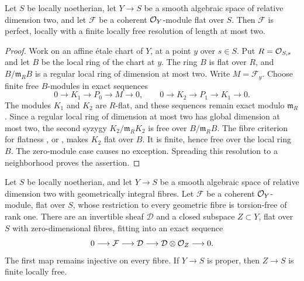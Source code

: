 \begin{lemma}\label{lem:smooth-surface-flat-perfect}
Let $S$ be locally noetherian, let $Y\to S$ be a smooth algebraic space
of relative dimension two, and let $\mathcal F$ be a coherent
$\mathcal O_Y$-module flat over $S$. Then $\mathcal F$ is perfect, locally
with a finite locally free resolution of length at most two.
\end{lemma}

\begin{proof}
Work on an affine \textup{\'etale} chart of $Y$, at a point $y$ over
$s\in S$. Put $R=\mathcal O_{S,s}$ and let $B$ be the local ring of the chart
at $y$. The ring $B$ is flat over $R$, and $B/\mathfrak m_RB$ is a
regular local ring of dimension at most two. Write $M=\mathcal F_y$.
Choose finite free $B$-modules in exact sequences
\[
 0\longrightarrow K_1\longrightarrow P_0\longrightarrow M
 \longrightarrow0,
 \qquad
 0\longrightarrow K_2\longrightarrow P_1\longrightarrow K_1
 \longrightarrow0.
\]
The modules $K_1$ and $K_2$ are $R$-flat, and these sequences remain
exact modulo $\mathfrak m_R$. Since a regular local ring of dimension
at most two has global dimension at most two, the second syzygy
$K_2/\mathfrak m_RK_2$ is free over $B/\mathfrak m_RB$.
The fibre criterion for flatness
\cite[IV$_3$, 11.3.10]{EGA}, or \cite[Tag~00MP]{Stacks}, makes
$K_2$ flat over $B$. It is finite, hence free over the local ring $B$.
The zero-module case causes no exception. Spreading this resolution
to a neighborhood proves the assertion.
\end{proof}

\begin{lemma}\label{lem:relative-surface-rank-one-defect}
Let $S$ be locally noetherian, and let $Y\to S$ be a smooth algebraic space of relative
dimension two with geometrically integral fibres. Let $\mathcal F$ be
a coherent $\mathcal O_Y$-module, flat over $S$, whose restriction to every
geometric fibre is torsion-free of rank one. There are an invertible
sheaf $\mathcal D$ and a closed subspace $Z\subset Y$, flat over $S$
with zero-dimensional fibres, fitting into an exact sequence
\[
 0\longrightarrow\mathcal F\longrightarrow\mathcal D
 \longrightarrow\mathcal D\otimes\mathcal O_Z\longrightarrow0.
\]
The first map remains injective on every fibre. If $Y\to S$ is proper,
then $Z\to S$ is finite locally free.
\end{lemma}


